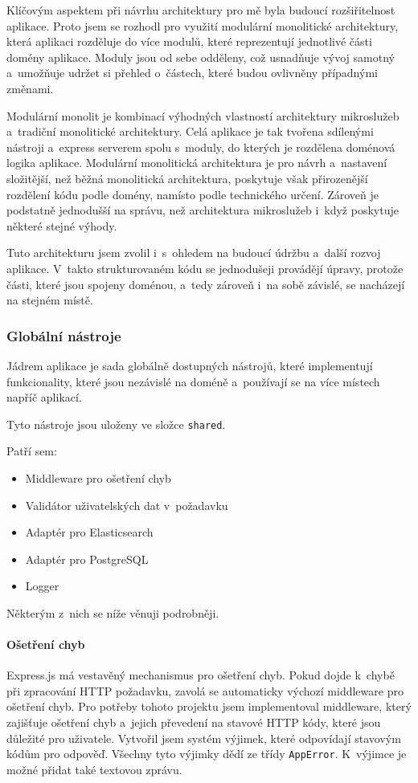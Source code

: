 \documentclass[
  tables=false,
  glossaries,
  index
]{kidiplom}
\begin{document}
Klíčovým aspektem při návrhu architektury pro mě byla budoucí rozšiřitelnost aplikace. Proto jsem se rozhodl pro využití modulární monolitické architektury, která aplikaci rozděluje do více modulů, které reprezentují jednotlivé části domény aplikace. Moduly jsou od sebe odděleny, což usnadňuje vývoj samotný a~umožňuje udržet si přehled o~částech, které budou ovlivněny případnými změnami.

Modulární monolit je kombinací výhodných vlastností architektury mikroslužeb a~tradiční monolitické architektury. Celá aplikace je tak tvořena sdílenými nástroji a~express serverem spolu s~moduly, do kterých je rozdělena doménová logika aplikace. Modulární monolitická architektura je pro návrh a~nastavení složitější, než běžná monolitická architektura, poskytuje však přirozenější rozdělení kódu podle domény, namísto podle technického určení. Zároveň je podstatně jednodušší na správu, než architektura mikroslužeb i~když poskytuje některé stejné výhody.

Tuto architekturu jsem zvolil i~s~ohledem na budoucí údržbu a~další rozvoj aplikace. V~takto strukturovaném kódu se jednodušeji provádějí úpravy, protože části, které jsou spojeny doménou, a~tedy zároveň i~na sobě závislé, se nacházejí na stejném místě.

\subsubsection{Globální nástroje}
Jádrem aplikace je sada globálně dostupných nástrojů, které implementují funkcionality, které jsou nezávislé na doméně a~používají se na více místech napříč aplikací.

Tyto nástroje jsou uloženy ve složce \texttt{shared}.

Patří sem:
\begin{itemize}
	\item Middleware pro ošetření chyb
	\item Validátor uživatelských dat v~požadavku
	\item Adaptér pro Elasticsearch
	\item Adaptér pro PostgreSQL
	\item Logger
\end{itemize}

Některým z~nich se níže věnuji podrobněji.

\paragraph{Ošetření chyb}
Express.js má vestavěný mechanismus pro ošetření chyb. Pokud dojde k~chybě při zpracování HTTP požadavku, zavolá se automaticky výchozí middleware pro ošetření chyb. Pro potřeby tohoto projektu jsem implementoval middleware, který zajišťuje ošetření chyb a~jejich převedení na stavové HTTP kódy, které jsou důležité pro uživatele. Vytvořil jsem systém výjimek, které odpovídají stavovým kódům pro odpověď. Všechny tyto výjimky dědí ze třídy \texttt{AppError}. K~výjimce je možné přidat také textovou zprávu.
\end{document}
